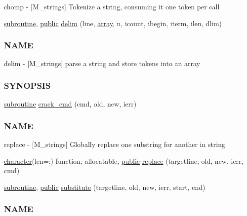 \begin{DoxyCompactItemize}
\begin{DoxyCompactList}
chomp -\/ \mbox{[}M\+\_\+strings\mbox{]} Tokenize a string, consuming it one token per call \end{DoxyCompactList}\item 
\hyperlink{M__stopwatch_83_8txt_acfbcff50169d691ff02d4a123ed70482}{subroutine}, \hyperlink{M__stopwatch_83_8txt_a2f74811300c361e53b430611a7d1769f}{public} \hyperlink{namespacem__strings_a9890da826d63d6f04367887007611cb5}{delim} (line, \hyperlink{intro__blas1_83_8txt_a89db1945e1a335ab0184c6a097821e32}{array}, n, icount, ibegin, iterm, ilen, dlim)
\begin{DoxyCompactList}\small\item\em \subsubsection*{N\+A\+ME}

delim -\/ \mbox{[}M\+\_\+strings\mbox{]} parse a string and store tokens into an array \subsubsection*{S\+Y\+N\+O\+P\+S\+IS}\end{DoxyCompactList}\item 
\hyperlink{M__stopwatch_83_8txt_acfbcff50169d691ff02d4a123ed70482}{subroutine} \hyperlink{namespacem__strings_a818d715927dd61c1be6df5d2cdec4e4c}{crack\+\_\+cmd} (cmd, old, new, ierr)
\begin{DoxyCompactList}\small\item\em \subsubsection*{N\+A\+ME}

replace -\/ \mbox{[}M\+\_\+strings\mbox{]} Globally replace one substring for another in string \end{DoxyCompactList}\item 
\hyperlink{option__stopwatch_83_8txt_abd4b21fbbd175834027b5224bfe97e66}{character}(len=\+:) function, allocatable, \hyperlink{M__stopwatch_83_8txt_a2f74811300c361e53b430611a7d1769f}{public} \hyperlink{namespacem__strings_a02d97675e95b9bd0ef3fd2abb9f2f435}{replace} (targetline, old, new, ierr, cmd)
\item 
\hyperlink{M__stopwatch_83_8txt_acfbcff50169d691ff02d4a123ed70482}{subroutine}, \hyperlink{M__stopwatch_83_8txt_a2f74811300c361e53b430611a7d1769f}{public} \hyperlink{namespacem__strings_ab84a4b7c2be211433c2d1b435a87fa32}{substitute} (targetline, old, new, ierr, start, end)
\begin{DoxyCompactList}\small\item\em \subsubsection*{N\+A\+ME}


\end{DoxyCompactList}
\end{DoxyCompactItemize}

